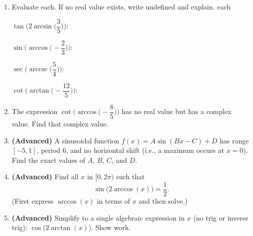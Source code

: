 \begin{enumerate}[leftmargin=*, label=\textbf{\arabic*.}, resume]
  \newpage
  \item Evaluate each. If no real value exists, write undefined and explain.  each

  $\tan\bigl(2\arcsin\bigl(\dfrac{3}{5}\bigr)\bigr)$: \blank

  $\sin\bigl(\arccos\bigl(-\dfrac{2}{3}\bigr)\bigr)$: \blank

  $\sec\bigl(\operatorname{arccsc}\bigl(\dfrac{5}{4}\bigr)\bigr)$: \blank

  $\cot\bigl(\arctan\bigl(-\dfrac{12}{5}\bigr)\bigr)$: \blank
  \vgappp

  \item The expression $\cot\bigl(\arccos\bigl(-\dfrac{8}{5}\bigr)\bigr)$ has no real value but has a complex value. Find that complex value. 
  \vgappp

  \item \textbf{(Advanced)} A sinusoidal function $f(x) = A\sin(Bx - C) + D$ has range $[-5, 1]$, period $6$, and no horizontal shift (i.e., a maximum occurs at $x = 0$). Find the exact values of $A$, $B$, $C$, and $D$. 
  \vgappp


  \newpage
  \item \textbf{(Advanced)} Find all $x$ in $[0, 2\pi)$ such that $$\sin\bigl(2\arccos(x)\bigr) = \dfrac{1}{2}.$$ (First express $\arccos(x)$ in terms of $x$ and then solve.) 
  \vgappp

  \item \textbf{(Advanced)} Simplify to a single algebraic expression in $x$ (no trig or inverse trig): $\cos\bigl(2\arctan(x)\bigr)$. Show work. 
  \vgappp

\end{enumerate}
